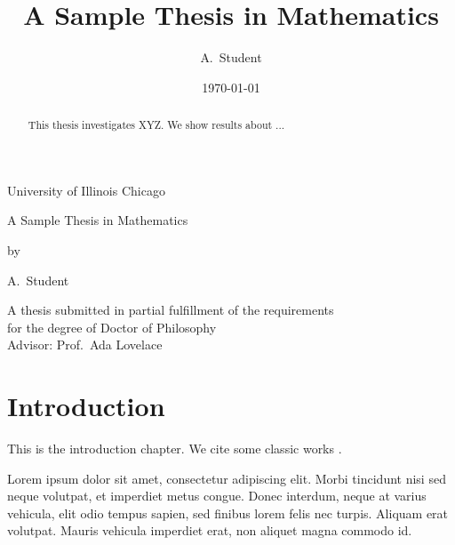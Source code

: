 \documentclass[12pt,reqno,oneside]{amsbook}
\theoremstyle{definition}
\begin{document}
\newcommand{\thetitle}{A Sample Thesis in Mathematics}
\title{\thetitle}
\date{\today}
\newcommand{\institution}{University of Illinois Chicago} 
\newcommand{\degree}{Doctor of Philosophy}
\newcommand{\advisor}{Prof.~Ada Lovelace}
\newcommand{\theauthor}{A.~Student}
\author{\theauthor}

\frontmatter

\begin{titlepage}
    \centering
    {\Large \institution\par}
    \vspace{2cm}
    {\Large \thetitle \par}
    \vspace{2cm}
    {\Large by\par}
    \vspace{0.5cm}
    {\Large \theauthor\par}
    \vfill
    A thesis submitted in partial fulfillment of the requirements \\
    for the degree of  \degree \\
    \vspace{0.5cm}
    Advisor: \advisor \\
    \vspace{1cm}
    \makeatletter\@date \makeatother
\end{titlepage}

\begin{abstract}
This thesis investigates XYZ. We show results about ...
\end{abstract}

\tableofcontents
\listoffigures

\mainmatter

\doublespacing %


\chapter{Introduction}
This is the introduction chapter. We cite some classic works \cite{Hartshorne,Mumford}.  

Lorem ipsum dolor sit amet, consectetur adipiscing elit. Morbi tincidunt nisi sed neque volutpat, et imperdiet metus congue. Donec interdum, neque at varius vehicula, elit odio tempus sapien, sed finibus lorem felis nec turpis. Aliquam erat volutpat. Mauris vehicula imperdiet erat, non aliquet magna commodo id.
\end{document}
